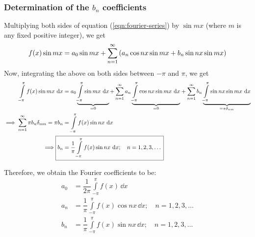         \subsubsection{Determination of the $b_n$ coefficients}
            Multiplying both sides of equation (\ref{eqn:fourier-series}) by $\sin{mx}$ (where $m$ is any fixed positive integer), we get
            \begin{align*}
                f(x)\sin{mx}=a_0\sin{mx}+\sum_{n=1}^{\infty}{\qty(a_n\cos{nx}\sin{mx}+b_n\sin{nx}\sin{mx})}
            \end{align*}
            Now, integrating the above on both sides between $-\pi$ and $\pi$, we get
            \begin{align}
                \int\limits_{-\pi}^{\pi}{f(x)\sin{mx}\,\dd{x}}&=a_0\underbrace{\int\limits_{-\pi}^{\pi}{\sin{mx}\,\dd{x}}}_{=0}+\sum_{n=1}^{\infty}{a_n\underbrace{\int\limits_{-\pi}^{\pi}{\cos{nx}\sin{mx}\,\dd{x}}}_{=0}}+\sum_{n=1}^{\infty}{b_n\underbrace{\int\limits_{-\pi}^{\pi}{\sin{nx}\sin{mx}\,\dd{x}}}_{=\pi\delta_{nm}}} \nonumber\\
                \implies\sum_{n=1}^{\infty}{\pi b_n\delta_{nm}}=\pi b_n&=\int\limits_{-\pi}^{\pi}{f(x)\sin{nx}\,\dd{x}} \nonumber\\
                \implies\Aboxed{b_n&=\dfrac{1}{\pi}\int\limits_{-\pi}^{\pi}{f(x)\sin{nx}\,\dd{x}};\quad n=1,2,3,\dots} \label{eqn:fourier-bn}
            \end{align}

        Therefore, we obtain the Fourier coefficients to be:
        \begin{align*}
            a_0&=\dfrac{1}{2\pi}\int\limits_{-\pi}^{\pi}{f(x)\,\dd{x}} \\
            a_n&=\dfrac{1}{\pi}\int\limits_{-\pi}^{\pi}{f(x)\cos{nx}\,\dd{x}};\quad n=1,2,3,\dots \\
            b_n&=\dfrac{1}{\pi}\int\limits_{-\pi}^{\pi}{f(x)\sin{nx}\,\dd{x}};\quad n=1,2,3,\dots
        \end{align*}